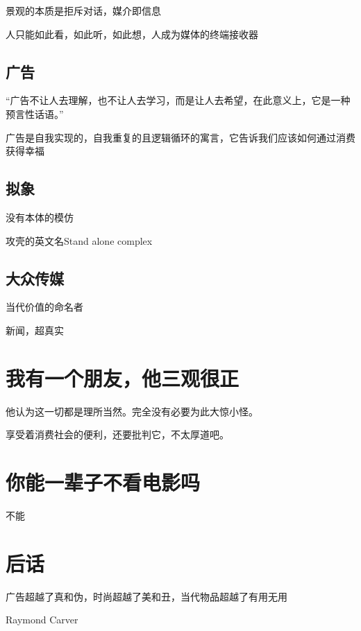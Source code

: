 \documentclass[UTF8]{article}
\begin{document}
景观的本质是拒斥对话，媒介即信息

人只能如此看，如此听，如此想，人成为媒体的终端接收器
\subsection{广告}
“广告不让人去理解，也不让人去学习，而是让人去希望，在此意义上，它是一种预言性话语。”

广告是自我实现的，自我重复的且逻辑循环的寓言，它告诉我们应该如何通过消费获得幸福

\subsection{拟象}
没有本体的模仿

攻壳的英文名Stand alone complex
\subsection{大众传媒}
当代价值的命名者

新闻，超真实
\section{我有一个朋友，他三观很正}
他认为这一切都是理所当然。完全没有必要为此大惊小怪。

享受着消费社会的便利，还要批判它，不太厚道吧。
\section{你能一辈子不看电影吗}
不能
\section{后话}
广告超越了真和伪，时尚超越了美和丑，当代物品超越了有用无用

Raymond Carver
%
\end{document}
